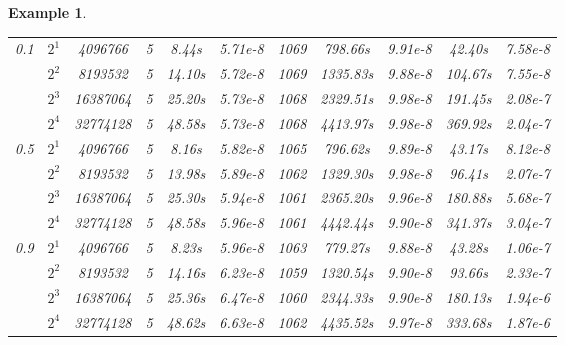 \documentclass[11pt]{article}%
\numberwithin{equation}{section}
\newtheorem{example}{Example}
\begin{document}
\begin{example}
{\begin{table}[H]
\begin{center}
\begin{tabular}[c]{ccc|ccc|ccc|cc}
					\hline
					\multirow{4}{*}{0.1} 
					&$2^1$ &4096766  &5   &8.44s   &5.71e-8 &1069&798.66s  &9.91e-8&42.40s &7.58e-8 \\
					&$2^2$ &8193532  &5   &14.10s  &5.72e-8 &1069&1335.83s &9.88e-8&104.67s&7.55e-8 \\
					&$2^3$ &16387064 &5   &25.20s  &5.73e-8 &1068&2329.51s &9.98e-8&191.45s&2.08e-7 \\
					&$2^4$ &32774128 &5   &48.58s  &5.73e-8 &1068&4413.97s &9.98e-8&369.92s&2.04e-7 \\
					\hline
					\multirow{4}{*}{0.5} 
					&$2^1$ &4096766  &5   &8.16s   &5.82e-8 &1065&796.62s  &9.89e-8&43.17s &8.12e-8 \\
					&$2^2$ &8193532  &5   &13.98s  &5.89e-8 &1062&1329.30s &9.98e-8&96.41s &2.07e-7 \\
					&$2^3$ &16387064 &5   &25.30s  &5.94e-8 &1061&2365.20s &9.96e-8&180.88s&5.68e-7 \\
					&$2^4$ &32774128 &5   &48.58s  &5.96e-8 &1061&4442.44s &9.90e-8&341.37s&3.04e-7 \\
					\hline
					\multirow{4}{*}{0.9}
					&$2^1$ &4096766  &5   &8.23s   &5.96e-8 &1063&779.27s  &9.88e-8&43.28s &1.06e-7 \\
					&$2^2$ &8193532  &5   &14.16s  &6.23e-8 &1059&1320.54s &9.90e-8&93.66s &2.33e-7 \\
					&$2^3$ &16387064 &5   &25.36s  &6.47e-8 &1060&2344.33s &9.90e-8&180.13s&1.94e-6 \\
					&$2^4$ &32774128 &5   &48.62s  &6.63e-8 &1062&4435.52s &9.97e-8&333.68s&1.87e-6 \\
					\hline
				\end{tabular}
			\end{center}
		\end{table}
		
}
\end{example}
\end{document}
